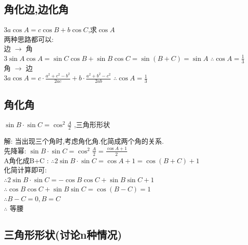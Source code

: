 \documentclass[hyperref, UTF8,11pt,a4paper]{ctexart} %
\begin{document}
\subsection{角化边,边化角}
{\color{red} $3a\cos A=c\cos B+b\cos C$,求$\cos A $} \\
两种思路都可以: \\
边 $\rightarrow$ 角 \\
$3 \sin A \cos A=\sin C \cos B+\sin B \cos C =\sin (B+C) =\sin A$
$\therefore   \cos A=\frac{1}{3}$ \\
角 $\rightarrow$ 边	 \\
$3 a \cos A=c \cdot \frac{a^{2}+c^{2}-b^{2}}{2 a c}+b \cdot \frac{a^{2}+b^{2}-c^{2}}{2 a b}$
$\therefore  \cos A=\frac{1}{3}$ \\
\subsection{角化角}
{\color{red} $\sin B \cdot \sin C=\cos ^{2} \frac{A}{2}$ ,三角形形状 }

解:{\color{blue} 当出现三个角时,考虑角化角.化简成两个角的关系.} \\
先降幂: $\sin B \cdot \sin C=\cos ^{2} \frac{A}{2}=\frac{\cos A+1}{2}$ \\
{\color{blue} A角化成B+C }: $\therefore 2 \sin B \cdot \sin C = \cos A+1 =\cos(B+C)+1$ \\
化简计算即可: \\
$\therefore 2 \sin B \cdot \sin C=-\cos B \cos C+\sin B \sin C+1$ \\
$\therefore \cos B \cos C+\sin B \sin C=\cos (B-C)=1$ \\
$\therefore B-C=0, B=C$ \\
$\therefore$ 等腰

\subsection{三角形形状(讨论n种情况)}
\end{document}
